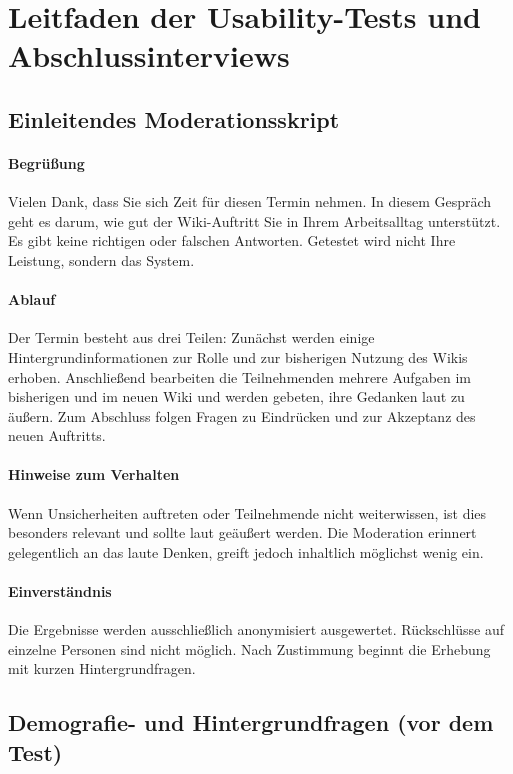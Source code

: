 \section{Leitfaden der Usability-Tests und Abschlussinterviews}
\label{sec:BB-02_leitfaden}

\subsection{Einleitendes Moderationsskript}

\paragraph{Begrüßung}
Vielen Dank, dass Sie sich Zeit für diesen Termin nehmen.
In diesem Gespräch geht es darum, wie gut der Wiki-Auftritt Sie in Ihrem Arbeitsalltag unterstützt.
Es gibt keine richtigen oder falschen Antworten. Getestet wird nicht Ihre Leistung, sondern das System.

\paragraph{Ablauf}
Der Termin besteht aus drei Teilen:
Zunächst werden einige Hintergrundinformationen zur Rolle und zur bisherigen Nutzung des Wikis erhoben.
Anschließend bearbeiten die Teilnehmenden mehrere Aufgaben im bisherigen und im neuen Wiki und werden gebeten, ihre Gedanken laut zu äußern.
Zum Abschluss folgen Fragen zu Eindrücken und zur Akzeptanz des neuen Auftritts.

\paragraph{Hinweise zum Verhalten}
Wenn Unsicherheiten auftreten oder Teilnehmende nicht weiterwissen, ist dies besonders relevant und sollte laut geäußert werden.
Die Moderation erinnert gelegentlich an das laute Denken, greift jedoch inhaltlich möglichst wenig ein.

\paragraph{Einverständnis}
Die Ergebnisse werden ausschließlich anonymisiert ausgewertet.
Rückschlüsse auf einzelne Personen sind nicht möglich.
Nach Zustimmung beginnt die Erhebung mit kurzen Hintergrundfragen.


\subsection{Demografie- und Hintergrundfragen (vor dem Test)}


